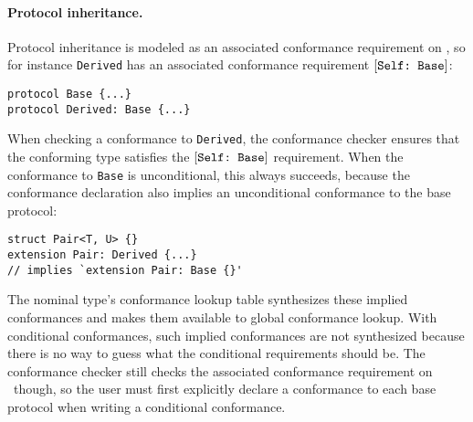 \documentclass[../generics]{subfiles}
\begin{document}
\paragraph{Protocol inheritance.}
Protocol inheritance is modeled as an associated conformance requirement on \tSelf, so for instance \verb|Derived| has an associated conformance requirement $[\texttt{Self:~Base}]$:
\begin{Verbatim}
protocol Base {...}
protocol Derived: Base {...}
\end{Verbatim}
When checking a conformance to \texttt{Derived}, the conformance checker ensures that the conforming type satisfies the $[\texttt{Self:~Base}]$ requirement. When the conformance to \texttt{Base} is unconditional, this always succeeds, because the conformance declaration also implies an unconditional conformance to the base protocol:
\begin{Verbatim}
struct Pair<T, U> {}
extension Pair: Derived {...}
// implies `extension Pair: Base {}'
\end{Verbatim}
The nominal type's conformance lookup table synthesizes these implied conformances and makes them available to global conformance lookup. With conditional conformances, such implied conformances are not synthesized because there is no way to guess what the conditional requirements should be. The conformance checker still checks the associated conformance requirement on \tSelf\ though, so the user must first explicitly declare a conformance to each base protocol when writing a conditional conformance.
\end{document}
